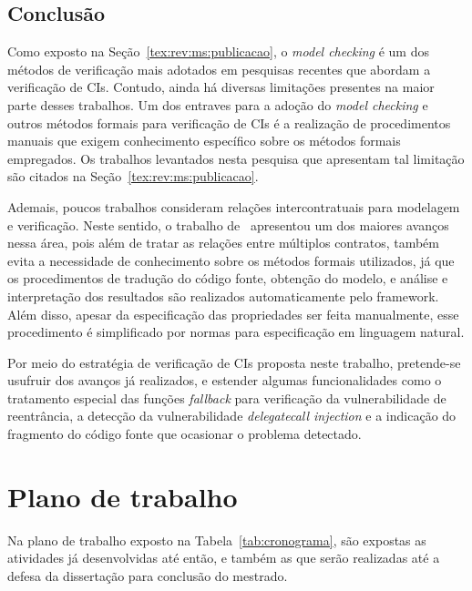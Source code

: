 
\subsection{Conclusão}

Como exposto na Seção~\ref{tex:rev:ms:publicacao}, o \textit{model checking} é um dos métodos de verificação mais adotados em pesquisas recentes que abordam a verificação de CIs. Contudo, ainda há diversas limitações presentes na maior parte desses trabalhos. Um dos entraves para a adoção do \textit{model checking} e outros métodos formais para verificação de CIs é a realização de procedimentos manuais que exigem conhecimento específico sobre os métodos formais empregados. Os trabalhos levantados nesta pesquisa que apresentam tal limitação são citados na Seção~\ref{tex:rev:ms:publicacao}. 

Ademais, poucos trabalhos consideram relações intercontratuais para modelagem e verificação. Neste sentido, o trabalho de~ apresentou um dos maiores avanços nessa área, pois além de tratar as relações entre múltiplos contratos, também evita a necessidade de conhecimento sobre os métodos formais utilizados, já que os procedimentos de tradução do código fonte, obtenção do modelo, e análise e interpretação dos resultados são realizados automaticamente pelo framework. Além disso, apesar da especificação das propriedades ser feita manualmente, esse procedimento é simplificado por normas para especificação em linguagem natural. 

Por meio do estratégia de verificação de CIs proposta neste trabalho, pretende-se usufruir dos avanços já realizados, e estender algumas funcionalidades como o tratamento especial das funções \textit{fallback} para verificação da vulnerabilidade de reentrância, a detecção da vulnerabilidade \textit{delegatecall injection} e a indicação do fragmento do código fonte que ocasionar o problema detectado.

\section{Plano de trabalho} \label{cap:cronograma}

Na plano de trabalho exposto na Tabela~\ref{tab:cronograma}, são expostas as atividades já desenvolvidas até então, e também as que serão realizadas até a defesa da dissertação para conclusão do mestrado. 

